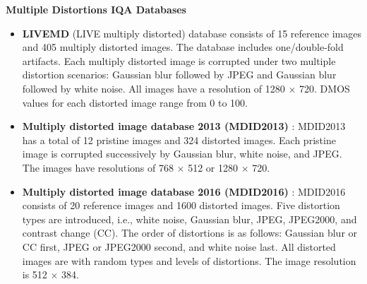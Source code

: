 \textbf{Multiple Distortions IQA Databases}
\begin{itemize}
    \item \textbf{LIVEMD} (LIVE multiply distorted) \autocite{LIVEMD} database consists of 15 reference images and 405 multiply distorted images. The database includes one/double-fold artifacts. Each multiply distorted image is corrupted under two multiple distortion scenarios: Gaussian blur followed by JPEG and Gaussian blur followed by white noise. All images have a resolution of 1280 $\times$ 720. DMOS values for each distorted image range from 0 to 100.
    \item \textbf{Multiply distorted image database 2013 (MDID2013)} \autocite{MDID2013}: MDID2013 has a total of 12 pristine images and 324 distorted images. Each pristine image is corrupted successively by Gaussian blur, white noise, and JPEG. The images have resolutions of 768 $\times$ 512 or 1280 $\times$ 720.
    \item \textbf{Multiply distorted image database 2016 (MDID2016)} \autocite{MDID2016}: MDID2016 consists of 20 reference images and 1600 distorted images. Five distortion types are introduced, i.e., white noise, Gaussian blur, JPEG, JPEG2000, and contrast change (CC). The order of distortions is as follows: Gaussian blur or CC first, JPEG or JPEG2000 second, and white noise last. All distorted images are with random types and levels of distortions. The image resolution is 512 $\times$ 384.
\end{itemize}

